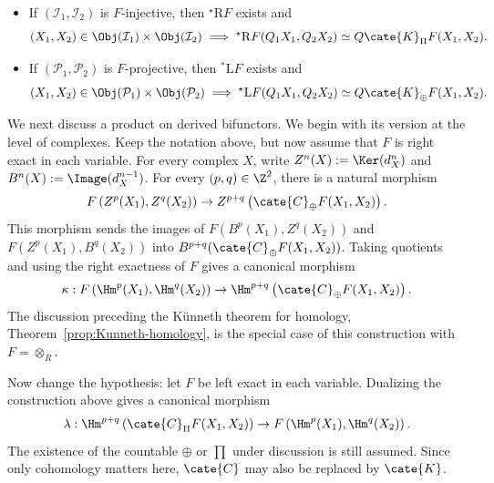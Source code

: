 \begin{itemize}
	\item If $(\mathcal{I}_1,\mathcal{I}_2)$ is $F$-injective, then
	${}^\star\mathrm{R}F$ exists and
	\begin{equation}\label{eqn:derived-bifunctor-1}
		(X_1, X_2) \in \Obj(\mathcal{I}_1) \times \Obj(\mathcal{I}_2) \implies {}^\star \mathrm{R}F(Q_1 X_1, Q_2 X_2) \simeq Q \cate{K}_{\Pi}F(X_1, X_2).
	\end{equation}
	\item If $(\mathcal{P}_1,\mathcal{P}_2)$ is $F$-projective, then
	${}^*\mathrm{L}F$ exists and
	\begin{equation}\label{eqn:derived-bifunctor-2}
		(X_1, X_2) \in \Obj(\mathcal{P}_1) \times \Obj(\mathcal{P}_2) \implies {}^\star \mathrm{L}F(Q_1 X_1, Q_2 X_2) \simeq Q \cate{K}_{\oplus}F(X_1, X_2).
	\end{equation}
\end{itemize}

We next discuss a product on derived bifunctors. We begin with its version at
the level of complexes. Keep the notation above, but now assume that $F$ is
right exact in each variable. For every complex $X$, write
$Z^n(X):=\Ker(d_X^n)$ and $B^n(X):=\Image(d_X^{n-1})$. For every
$(p,q)\in\Z^2$, there is a natural morphism
\[ F\left( Z^p(X_1), Z^q(X_2) \right) \to Z^{p+q}\left( \cate{C}_{\oplus}F(X_1, X_2) \right). \]
This morphism sends the images of $F(B^p(X_1),Z^q(X_2))$ and
$F(Z^p(X_1),B^q(X_2))$ into
$B^{p+q}(\cate{C}_{\oplus}F(X_1,X_2))$. Taking quotients and using the right
exactness of $F$ gives a canonical morphism
\[ \kappa: F\left(\Hm^p(X_1), \Hm^q(X_2)\right) \to \Hm^{p+q}\left( \cate{C}_{\oplus} F(X_1, X_2) \right). \]
The discussion preceding the Künneth theorem for homology,
Theorem~\ref{prop:Kunneth-homology}, is the special case of this construction
with $F=\otimes_R$.

Now change the hypothesis: let $F$ be left exact in each variable. Dualizing
the construction above gives a canonical morphism
\[ \lambda: \Hm^{p+q}\left( \cate{C}_{\Pi} F(X_1, X_2) \right) \to F\left( \Hm^p(X_1), \Hm^q(X_2) \right). \]
The existence of the countable $\oplus$ or $\prod$ under discussion is still
assumed. Since only cohomology matters here, $\cate{C}$ may also be replaced
by $\cate{K}$.

